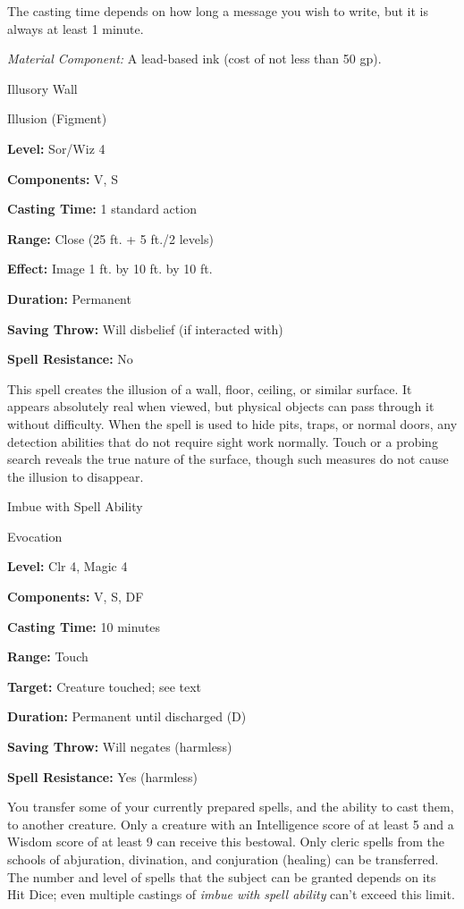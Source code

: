 \documentclass{article}
\begin{document}
The casting time depends on how long a message you wish to write, but it is always 
at least 1 minute.

\textit{Material Component: }A lead-based ink (cost of not less than 50 gp).

\vspace{12pt}
Illusory Wall

Illusion (Figment)

\textbf{Level:} Sor/Wiz 4

\textbf{Components:} V, S

\textbf{Casting Time:} 1 standard action

\textbf{Range:} Close (25 ft. + 5 ft./2 levels)

\textbf{Effect:} Image 1 ft. by 10 ft. by 10 ft.

\textbf{Duration:} Permanent

\textbf{Saving Throw: }Will disbelief (if interacted with)

\textbf{Spell Resistance:} No

This spell creates the illusion of a wall, floor, ceiling, or similar surface. 
It appears absolutely real when viewed, but physical objects can pass through it 
without difficulty. When the spell is used to hide pits, traps, or normal doors, 
any detection abilities that do not require sight work normally. Touch or a probing 
search reveals the true nature of the surface, though such measures do not cause 
the illusion to disappear.

\vspace{12pt}
Imbue with Spell Ability

Evocation

\textbf{Level:} Clr 4, Magic 4

\textbf{Components:} V, S, DF

\textbf{Casting Time:} 10 minutes

\textbf{Range:} Touch

\textbf{Target:} Creature touched; see text

\textbf{Duration:} Permanent until discharged (D)

\textbf{Saving Throw: }Will negates (harmless)

\textbf{Spell Resistance:} Yes (harmless)

You transfer some of your currently prepared spells, and the ability to cast them, 
to another creature. Only a creature with an Intelligence score of at least 5 and 
a Wisdom score of at least 9 can receive this bestowal. Only cleric spells from 
the schools of abjuration, divination, and conjuration (healing) can be transferred. 
The number and level of spells that the subject can be granted depends on its Hit 
Dice; even multiple castings of \textit{imbue with spell ability }can't exceed 
this limit.
\end{document}

